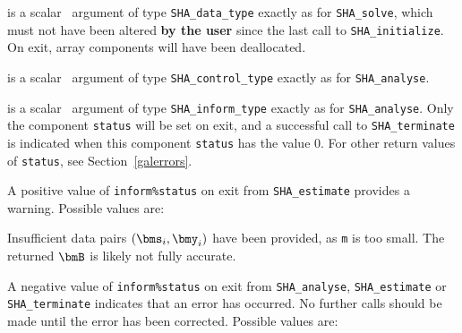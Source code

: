 \documentclass{galahad}
\newcommand{\packagename}{SHA}
\begin{document}
\vspace*{-1mm}
\begin{description}

 is a scalar \intentinout\ argument of type
{\tt \packagename\_data\_type}
exactly as for
{\tt \packagename\_solve},
which must not have been altered {\bf by the user} since the last call to
{\tt \packagename\_initialize}.
On exit, array components will have been deallocated.

 is a scalar \intentin\ argument of type
{\tt \packagename\_control\_type}
exactly as for
{\tt \packagename\_analyse}.

 is a scalar \intentout\ argument of type
{\tt \packagename\_inform\_type}
exactly as for
{\tt \packagename\_analyse}.
Only the component {\tt status} will be set on exit, and a
successful call to
{\tt \packagename\_terminate}
is indicated when this  component {\tt status} has the value 0.
For other return values of {\tt status}, see Section~\ref{galerrors}.

\end{description}


\galerrors
A positive value of {\tt inform\%status} on exit from
{\tt \packagename\_estimate}
provides a warning. Possible values are:

\begin{description}
 Insufficient data pairs $(\bms_i,\bmy_i)$ have been provided, as
{\tt m} is too small. The returned $\bmB$ is likely not fully accurate.
\end{description}

A negative value of {\tt inform\%status} on exit from
{\tt \packagename\_analyse},
{\tt \packagename\_estimate}
or
{\tt \packagename\_terminate}
indicates that an error has occurred. No further calls should be made
until the error has been corrected. Possible values are:
\end{document}
